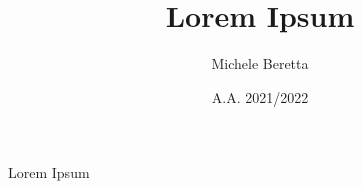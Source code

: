 \documentclass[a4paper,12pt,twoside,openright]{report}
\title{
  Lorem Ipsum
}
\author{Michele Beretta}
\date{A.A. 2021/2022}
\begin{document}
  \maketitle
  Lorem Ipsum
\end{document}
